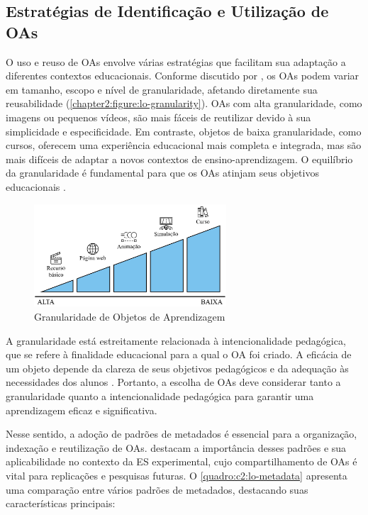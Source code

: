 \subsection{Estratégias de Identificação e Utilização de OAs}

O uso e reuso de OAs envolve várias estratégias que facilitam sua adaptação a diferentes contextos educacionais. Conforme discutido por , os OAs podem variar em tamanho, escopo e nível de granularidade, afetando diretamente sua reusabilidade (\autoref{chapter2:figure:lo-granularity}). OAs com alta granularidade, como imagens ou pequenos vídeos, são mais fáceis de reutilizar devido à sua simplicidade e especificidade. Em contraste, objetos de baixa granularidade, como cursos, oferecem uma experiência educacional mais completa e integrada, mas são mais difíceis de adaptar a novos contextos de ensino-aprendizagem. O equilíbrio da granularidade é fundamental para que os OAs atinjam seus objetivos educacionais \cite{Tarouco2021}.

\begin{figure}[htb]
\centering
\caption{Granularidade de Objetos de Aprendizagem}
\label{chapter2:figure:lo-granularity}
\includegraphics[width=0.64\textwidth]{images/chapter2-lo-granularity.jpg}
\end{figure}



A granularidade está estreitamente relacionada à intencionalidade pedagógica, que se refere à finalidade educacional para a qual o OA foi criado. A eficácia de um objeto depende da clareza de seus objetivos pedagógicos e da adequação às necessidades dos alunos \cite{Bloom1984}. Portanto, a escolha de OAs deve considerar tanto a granularidade quanto a intencionalidade pedagógica para garantir uma aprendizagem eficaz e significativa.

Nesse sentido, a adoção de padrões de metadados é essencial para a organização, indexação e reutilização de OAs.  destacam a importância desses padrões e sua aplicabilidade no contexto da ES experimental, cujo compartilhamento de OAs é vital para replicações e pesquisas futuras. O \autoref{quadro:c2:lo-metadata} apresenta uma comparação entre vários padrões de metadados, destacando suas características principais:

